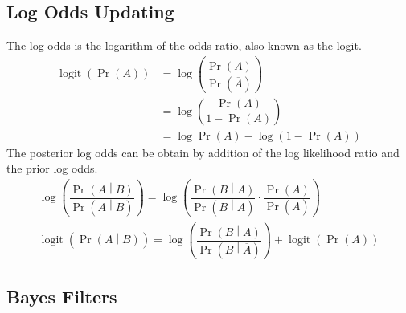 \documentclass[11pt]{report} %
\begin{document}
\subsection{Log Odds Updating}

The log odds is the logarithm of the odds ratio, also known as the logit.
\begin{align}
\operatorname{logit}\left(\operatorname{Pr}\left(A\right)\right) &= \log\left(\dfrac{\operatorname{Pr}\left(A\right)}{\operatorname{Pr}\left(\overline{A}\right)}\right) \\
&= \log\left(\dfrac{\operatorname{Pr}\left(A\right)}{1 - \operatorname{Pr}\left(A\right)}\right) \\
&= \log\operatorname{Pr}\left(A\right) - \log\left(1 - \operatorname{Pr}\left(A\right)\right)
\end{align}
The posterior log odds can be obtain by addition of the log likelihood ratio and the prior log odds.
\begin{gather}
\log\left(\dfrac{\operatorname{Pr}\left(A\middle|B\right)}{\operatorname{Pr}\left(\overline{A}\middle|B\right)}\right) = \log\left(\dfrac{\operatorname{Pr}\left(B\middle|A\right)}{\operatorname{Pr}\left(B\middle|\overline{A}\right)}\cdot\dfrac{\operatorname{Pr}\left(A\right)}{\operatorname{Pr}\left(\overline{A}\right)}\right) \\
\operatorname{logit}\left(\operatorname{Pr}\left(A\middle|B\right)\right) = \log\left(\dfrac{\operatorname{Pr}\left(B\middle|A\right)}{\operatorname{Pr}\left(B\middle|\overline{A}\right)}\right) + \operatorname{logit}\left(\operatorname{Pr}\left(A\right)\right)
\end{gather}

\subsection{Bayes Filters \cite{Thrun2005}}
\end{document}
